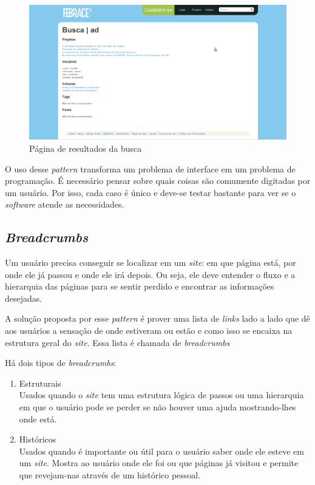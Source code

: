     \begin{figure}[h]
        \begin{center}
    \includegraphics[width=1.0\linewidth]{arquivos/forgiving_formats.png}
        \end{center}
        \caption{Página de resultados da busca}
        \label{forgiving_formats}
    \end{figure}

O uso desse \textit{pattern} transforma um problema de interface em um problema de programação. É necessário pensar sobre quais coisas são comumente digitadas por um usuário. Por isso, cada caso é único e deve-se testar bastante para ver se o \textit{software} atende as necessidades.

\subsection{\textit{Breadcrumbs}}

Um usuário precisa conseguir se localizar em um \textit{site}: em que página está, por onde ele já passou e onde ele irá depois. Ou seja, ele deve entender o fluxo e a hierarquia das páginas para se sentir perdido e encontrar as informações desejadas.

A solução proposta por esse \textit{pattern} é prover uma lista de \textit{links} lado a lado que dê aos usuários a sensação de onde estiveram ou estão e como isso se encaixa na estrutura geral do \textit{site}. Essa lista é chamada de \textit{breadcrumbs}

Há dois tipos de \textit{breadcrumbs}:

    \begin{enumerate}
        \item Estruturais \\
            Usados quando o \textit{site} tem uma estrutura lógica de passos ou uma hierarquia em que o usuário pode se perder se não houver uma ajuda mostrando-lhes onde está.
        \item Históricos \\
            Usados quando é importante ou útil para o usuário saber onde ele esteve em um \textit{site}. Mostra ao usuário onde ele foi ou que páginas já visitou e permite que revejam-nas através de um histórico pessoal.
    \end{enumerate}

